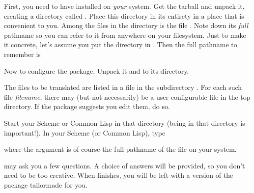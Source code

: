 First, you need to have  installed on {\em
your} system.  Get the  tarball and unpack
it, creating a directory called .  Place
this directory in its entirety in a place that is
convenient to you.  Among the files in the directory
 is the file .  Note down
its {\em full} pathname so you can refer to it from
anywhere on your filesystem. 
Just to make it concrete, let's assume you put the
 directory in .  Then the
full pathname to remember is



Now to configure the  package.  Unpack it
and  to its directory.  

The files to be translated are listed in a file
 in the subdirectory
.  For each such file {\em filename}, there
may (but not necessarily) be a user-configurable file
 in the top directory.  If
the package suggests you edit them, do so.

Start your Scheme or
Common Lisp in that directory (being in that directory
is important!).  In your Scheme (or Common Lisp), type 



\n where the  argument is of course the  full
pathname of the file  on your system.

 may ask you a few questions.  A
choice of answers will be provided, so you don't need
to be too creative.  When  finishes, you
will be left with a version of the package tailormade
for you.


\bye

